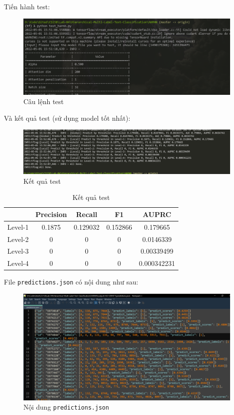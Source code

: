 \documentclass[12pt]{article}
\begin{document}
Tiến hành test:
\begin{figure}[H]
    \centering
    \includegraphics[scale=.7]{img/start-testing.PNG}
    \caption{Câu lệnh test}
    \label{fig:start_testing}
\end{figure}

Và kết quả test (sử dụng model tốt nhất):
\begin{figure}[H]
    \centering
    \includegraphics[scale=.65]{img/test-result.PNG}
    \caption{Kết quả test}
    \label{fig:testing_result}
\end{figure}
\begin{table}[H]
    \centering
    \begin{tabular}{|c|c|c|c|c|}
        \hline
        & Precision & Recall & F1 & AUPRC \\
        \hline
        Level-1 & 0.1875 & 0.129032 & 0.152866 & 0.179665 \\
        Level-2 & 0 & 0 & 0 & 0.0146339 \\
        Level-3 & 0 & 0 & 0 & 0.00339499 \\
        Level-4 & 0 & 0 & 0 & 0.000342231 \\
        \hline
    \end{tabular}
    \caption{Kết quả test}
    \label{tab:my_label}
\end{table}
File \texttt{predictions.json} có nội dung như sau:
\begin{figure}[H]
    \centering
    \includegraphics[scale=.45]{img/predictions-json.PNG}
    \caption{Nội dung \texttt{predictions.json}}
    \label{fig:predictions_json}
\end{figure}
\end{document}
